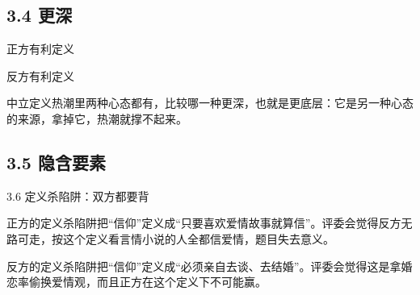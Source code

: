 \documentclass[prep,both]{debate}
\begin{document}
\subsection{3.4 更深}
\begin{fields}
\begin{procard}{正方有利定义}\end{procard}
\begin{concard}{反方有利定义}\end{concard}
\begin{neutralcard}{中立定义}热潮里两种心态都有，比较哪一种更深，也就是更底层：它是另一种心态的来源，拿掉它，热潮就撑不起来。\end{neutralcard}
\end{fields}

\subsection{3.5 隐含要素}
\begin{fields}
\end{fields}

\begin{warnbox}{3.6 定义杀陷阱：双方都要背}
\begin{fields}
\begin{procard}{正方的定义杀陷阱}把“信仰”定义成“只要喜欢爱情故事就算信”。评委会觉得反方无路可走，按这个定义看言情小说的人全都信爱情，题目失去意义。\end{procard}
\begin{concard}{反方的定义杀陷阱}把“信仰”定义成“必须亲自去谈、去结婚”。评委会觉得这是拿婚恋率偷换爱情观，而且正方在这个定义下不可能赢。\end{concard}
\end{fields}
\end{warnbox}
\end{document}
